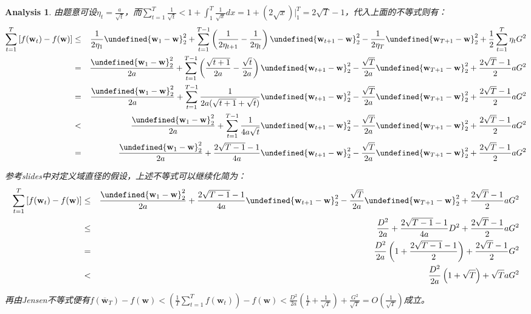 \documentclass[a4paper,UTF8]{article}
\let\norm\undefined %
\DeclarePairedDelimiter\norm{\lVert}{\rVert}
\numberwithin{equation}{section}
\newtheorem*{myAnalysis}{Analysis}
\begin{document}
\begin{myAnalysis}
由题意可设$\eta_t = \frac{a}{\sqrt{t}}$，而$\sum_{t=1}^T \frac{1}{\sqrt{t}} < 1 + \int_1^T \frac{1}{\sqrt{x}} dx = 1 + (2\sqrt{x})|_1^T = 2\sqrt{T} - 1$，代入上面的不等式则有：
\begin{eqnarray*}
\sum_{t=1}^T \left[ f(\mathbf{w}_t) - f(\mathbf{w}) \right] &\le& \frac{1}{2\eta_1} \norm{\mathbf{w}_1 - \mathbf{w}}_2^2 + \sum_{t=1}^{T - 1} \left( \frac{1}{2\eta_{t+1}} - \frac{1}{2\eta_t} \right) \norm{\mathbf{w}_{t+1} - \mathbf{w}}_2^2 - \frac{1}{2\eta_T}\norm{\mathbf{w}_{T+1} - \mathbf{w}}_2^2 + \frac{1}{2} \sum_{t=1}^T \eta_t G^2 \\
&=& \frac{\norm{\mathbf{w}_1 - \mathbf{w}}_2^2}{2a} + \sum_{t=1}^{T - 1} \left( \frac{\sqrt{t+1}}{2a} - \frac{\sqrt{t}}{2a} \right) \norm{\mathbf{w}_{t+1} - \mathbf{w}}_2^2 - \frac{\sqrt{T}}{2a}\norm{\mathbf{w}_{T+1} - \mathbf{w}}_2^2 + \frac{2\sqrt{T} - 1}{2} aG^2 \\
&=& \frac{\norm{\mathbf{w}_1 - \mathbf{w}}_2^2}{2a} + \sum_{t=1}^{T - 1} \frac{1}{2a(\sqrt{t+1} + \sqrt{t})}  \norm{\mathbf{w}_{t+1} - \mathbf{w}}_2^2 - \frac{\sqrt{T}}{2a}\norm{\mathbf{w}_{T+1} - \mathbf{w}}_2^2 + \frac{2\sqrt{T} - 1}{2} aG^2 \\
&<& \frac{\norm{\mathbf{w}_1 - \mathbf{w}}_2^2}{2a} + \sum_{t=1}^{T - 1} \frac{1}{4a\sqrt{t}}  \norm{\mathbf{w}_{t+1} - \mathbf{w}}_2^2 - \frac{\sqrt{T}}{2a}\norm{\mathbf{w}_{T+1} - \mathbf{w}}_2^2 + \frac{2\sqrt{T} - 1}{2} a G^2 \\
&=& \frac{\norm{\mathbf{w}_1 - \mathbf{w}}_2^2}{2a} + \frac{2\sqrt{T-1} -1}{4a}  \norm{\mathbf{w}_{t+1} - \mathbf{w}}_2^2 - \frac{\sqrt{T}}{2a}\norm{\mathbf{w}_{T+1} - \mathbf{w}}_2^2 + \frac{2\sqrt{T} - 1}{2}a G^2
\end{eqnarray*}

参考slides中对定义域直径的假设，上述不等式可以继续化简为：
\begin{eqnarray*}
\sum_{t=1}^T \left[ f(\mathbf{w}_t) - f(\mathbf{w}) \right] &\le& \frac{\norm{\mathbf{w}_1 - \mathbf{w}}_2^2}{2a} + \frac{2\sqrt{T-1} -1}{4a}  \norm{\mathbf{w}_{t+1} - \mathbf{w}}_2^2 - \frac{\sqrt{T}}{2a}\norm{\mathbf{w}_{T+1} - \mathbf{w}}_2^2 + \frac{2\sqrt{T} - 1}{2} aG^2 \\
&\le& \frac{D^2}{2a} + \frac{2\sqrt{T-1} -1}{4a}  D^2 + \frac{2\sqrt{T} - 1}{2}a G^2 \\
&=& \frac{D^2}{2a} \left( 1 + \frac{2\sqrt{T-1} -1}{2} \right) + \frac{2\sqrt{T} - 1}{2} G^2 \\
&<& \frac{D^2}{2a} \left( 1 + \sqrt{T} \right) + \sqrt{T}a G^2
\end{eqnarray*}

再由Jensen不等式便有$f(\overline{\mathbf{w}}_T) - f(\mathbf{w}) < \left( \frac{1}{T} \sum_{t=1}^T f(\mathbf{w}_t) \right) - f(\mathbf{w}) < \frac{D^2}{2a} (\frac{1}{T} + \frac{1}{\sqrt{T}}) + \frac{G^2}{\sqrt{T}} = O\left(\frac{1}{\sqrt{T}}\right)$成立。

	~\\
	~\\
	~\\
	~\\	
	~\\
\end{myAnalysis}
\end{document}
